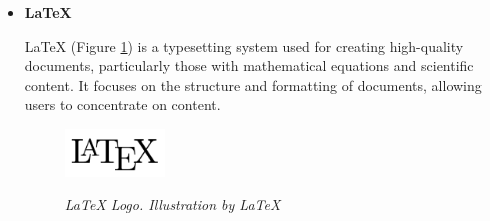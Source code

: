 \begin{itemize}
  \item \textbf{LaTeX}

    LaTeX (Figure \ref{fig:latex-logo}) is a typesetting system used for creating high-quality documents, particularly those with mathematical equations and scientific content. It focuses on the structure and formatting of documents, allowing users to concentrate on content.

    \begin{figure}[H]
      \centering
      \begin{adjustbox}{trim=0cm 0cm, clip}
        \includegraphics[width=0.25\textwidth]{imatges/studies_and_decisions/latex-logo.png}
      \end{adjustbox}
      \caption[LaTeX Logo]{\textit{LaTeX Logo. Illustration by LaTeX}}
      {\label{fig:latex-logo}}
    \end{figure}
\end{itemize}
